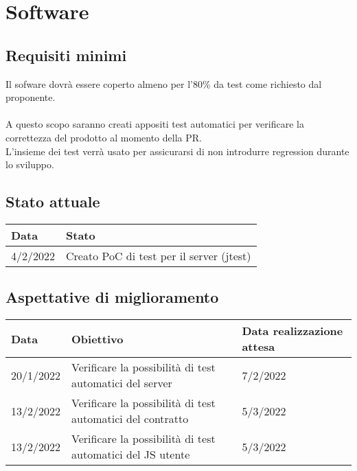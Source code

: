 \documentclass[a4paper, 12pt]{article}
\begin{document}
\section{Software}
\subsection{Requisiti minimi}
Il sofware dovrà essere coperto almeno per l'80\% da test come richiesto dal proponente.\\\\
A questo scopo saranno creati appositi test automatici per verificare la correttezza del prodotto al momento della PR.\\
L'insieme dei test verrà usato per assicurarsi di non introdurre regression durante lo sviluppo.

\subsection{Stato attuale}
\begin{tabular}{|l|l|}\hline
	Data & Stato \\\hline
	4/2/2022 & Creato PoC di test per il server (jtest)\\\hline
\end{tabular}

\subsection{Aspettative di miglioramento}
\begin{tabular}{|l|l|l|}\hline
	Data & Obiettivo & Data realizzazione attesa \\\hline
	20/1/2022 & Verificare la possibilità di test automatici del server & 7/2/2022\\\hline
	13/2/2022 & Verificare la possibilità di test automatici del contratto & 5/3/2022\\\hline
	13/2/2022 & Verificare la possibilità di test automatici del JS utente & 5/3/2022\\\hline
\end{tabular}
\end{document}
